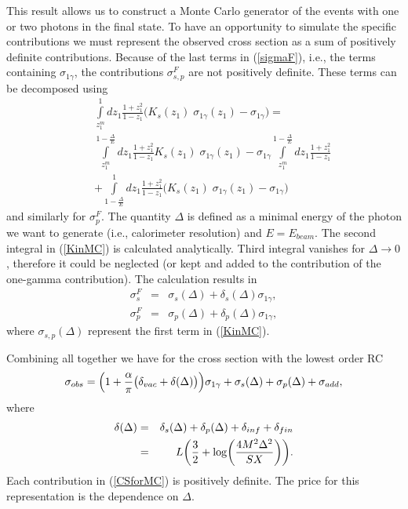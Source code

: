 \documentclass[aps,prd,reprint,groupedaddress,preprintnumbers,showpacs]{revtex4-1}
\begin{document}
This result allows us to construct a Monte Carlo generator of the events with one or two photons in the final state. To have an opportunity to simulate the specific contributions we must  represent the observed cross section as a sum of positively definite contributions. Because of the last terms in (\ref{sigmaF}), i.e., the terms containing $\sigma _{1\gamma}$, the contributions $\sigma_{s,p}^F$ are not positively definite. These terms can be decomposed using
\begin{eqnarray} \label{KinMC}
&&\int\limits_{z_1^m}^1 dz_1 \frac {1+z_1^2}{1-z_1} \biggl(K_s(z_1)\;\sigma _{1\gamma}(z_1)-\sigma _{1\gamma}\biggr)= \nonumber\\
&&\int\limits_{z_1^m}^{1-\frac{\Delta}{E}} dz_1 \frac {1+z_1^2}{1-z_1} K_s(z_1)\;\sigma _{1\gamma}(z_1) 
-\sigma _{1\gamma}\int\limits_{z_1^m}^{1-\frac{\Delta}{E}}  dz_1 \frac {1+z_1^2}{1-z_1}  \nonumber\\
&&+\int\limits_{1-\frac{\Delta}{E}}^1 dz_1 \frac {1+z_1^2}{1-z_1} \biggl(K_s(z_1)\;\sigma _{1\gamma}(z_1)-\sigma _{1\gamma}\biggr) \end{eqnarray}
and similarly for $\sigma_{p}^F$. The quantity $\Delta$ is defined as a minimal energy of the photon we want to generate (i.e., calorimeter resolution)
and $E=E_{beam}$.
The second integral  in (\ref{KinMC})  is calculated analytically. Third integral vanishes for $\Delta\rightarrow 0$, therefore it could be neglected (or kept and added to the contribution of the one-gamma contribution). The calculation  results in  
\begin{eqnarray} 
\sigma_s^F&=&\sigma_s(\Delta) + \delta_s(\Delta)\sigma_{1\gamma},
\nonumber\\
\sigma_p^F&=&\sigma_p(\Delta) + \delta_p(\Delta)\sigma_{1\gamma},
\end{eqnarray}
where $\sigma_{s,p}(\Delta)$ represent the first term in (\ref{KinMC}). 


Combining all together we have for the cross section with the lowest order RC
\begin{equation}\label{CSforMC}
\sigma _{obs}=\Bigl( 1 + \frac{\alpha}{\pi}\bigl( \delta_{vac}+\delta(\Delta)\bigr)\Bigr) \sigma _{1\gamma} + \sigma_{s}(\Delta)+\sigma_p(\Delta)+\sigma_{add},
\end{equation}
where 
\begin{eqnarray}
\delta(\Delta)&=&\delta_s(\Delta)+\delta_p(\Delta)+\delta_{inf}+\delta_{fin}
\nonumber\\
&=&L\biggl(\frac{3}{2}+\log\biggl({4M^2\Delta^2\over SX}\biggr)\biggr).
\end{eqnarray}
Each contribution in (\ref{CSforMC}) is positively definite. The price for this representation is the dependence on $\Delta$. 
\end{document}
